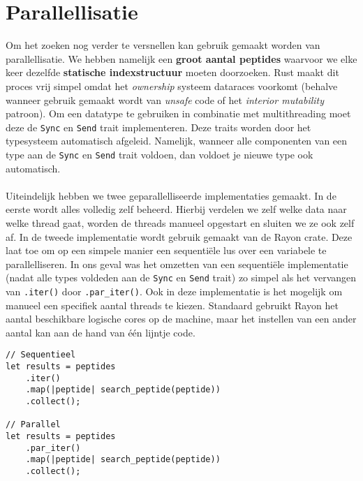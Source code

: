 \section{Parallellisatie}\label{sec:parallellisatie}
Om het zoeken nog verder te versnellen kan gebruik gemaakt worden van parallellisatie.
We hebben namelijk een \textbf{groot aantal peptides} waarvoor we elke keer dezelfde \textbf{statische indexstructuur} moeten doorzoeken.
Rust maakt dit proces vrij simpel omdat het \textit{ownership} systeem dataraces voorkomt (behalve wanneer gebruik gemaakt wordt van \textit{unsafe} code of het \textit{interior mutability} patroon)\cite{rust_data_races}.
Om een datatype te gebruiken in combinatie met multithreading moet deze de \texttt{Sync} en \texttt{Send} trait implementeren.
Deze traits worden door het typesysteem automatisch afgeleid.
Namelijk, wanneer alle componenten van een type aan de \texttt{Sync} en \texttt{Send} trait voldoen, dan voldoet je nieuwe type ook automatisch.
\\ \\
Uiteindelijk hebben we twee geparallelliseerde implementaties gemaakt.
In de eerste wordt alles volledig zelf beheerd.
Hierbij verdelen we zelf welke data naar welke thread gaat, worden de threads manueel opgestart en sluiten we ze ook zelf af.
In de tweede implementatie wordt gebruik gemaakt van de Rayon crate\cite{rayon}.
Deze laat toe om op een simpele manier een sequentiële lus over een variabele te parallelliseren.
In ons geval was het omzetten van een sequentiële implementatie (nadat alle types voldeden aan de \texttt{Sync} en \texttt{Send} trait) zo simpel als het vervangen van \texttt{.iter()} door \texttt{.par\_iter()}.
Ook in deze implementatie is het mogelijk om manueel een specifiek aantal threads te kiezen.
Standaard gebruikt Rayon het aantal beschikbare logische cores op de machine, maar het instellen van een ander aantal kan aan de hand van één lijntje code.

\begin{verbatim}
// Sequentieel
let results = peptides
    .iter()
    .map(|peptide| search_peptide(peptide))
    .collect();

// Parallel
let results = peptides
    .par_iter()
    .map(|peptide| search_peptide(peptide))
    .collect();
\end{verbatim}


